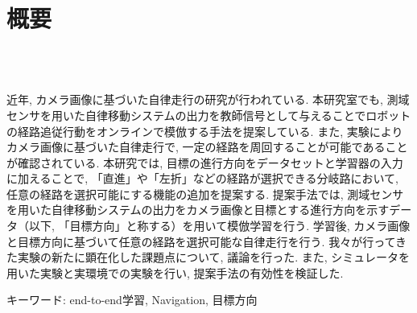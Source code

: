 \chapter*{概要}
\thispagestyle{empty}
%
\begin{center}
  \scalebox{1.5}{視覚と行動のend-to-end学習により}\\
  \scalebox{1.5}{経路追従行動をオンラインで模倣する手法の提案}\\
  \scalebox{1.5}{（目標方向による経路選択機能の追加と検証）}
\end{center}
\vspace{1.0zh}
%
\par
近年, カメラ画像に基づいた自律走行の研究が行われている. 本研究室でも, 測域センサを用いた自律移動システムの出力を教師信号として与えることでロボットの経路追従行動をオンラインで模倣する手法を提案している. また, 実験によりカメラ画像に基づいた自律走行で, 一定の経路を周回することが可能であることが確認されている. 本研究では, 目標の進行方向をデータセットと学習器の入力に加えることで, 「直進」や「左折」などの経路が選択できる分岐路において, 任意の経路を選択可能にする機能の追加を提案する. 提案手法では, 測域センサを用いた自律移動システムの出力をカメラ画像と目標とする進行方向を示すデータ（以下, 「目標方向」と称する）を用いて模倣学習を行う. 学習後, カメラ画像と目標方向に基づいて任意の経路を選択可能な自律走行を行う. 
我々が行ってきた実験の新たに顕在化した課題点について, 議論を行った.
また, シミュレータを用いた実験と実環境での実験を行い, 提案手法の有効性を検証した. 

キーワード: end-to-end学習, Navigation, 目標方向
%
\newpage
